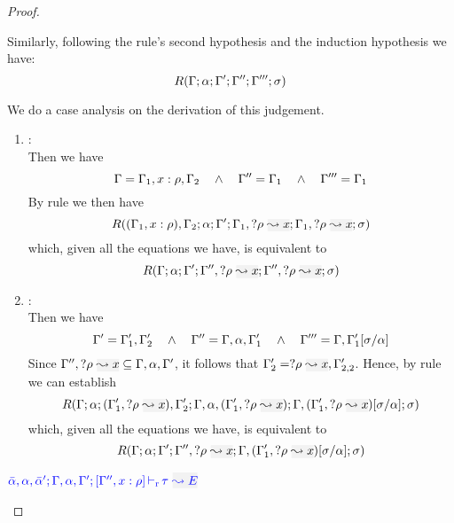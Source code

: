 \begin{proof}
\begin{description}
  Similarly, following the rule's second hypothesis and the induction hypothesis we have:
\begin{equation*}
  R(\Gamma;\alpha;\Gamma';\Gamma'';\Gamma''';\sigma)
\end{equation*}

  We do a case analysis on the derivation of this judgement.
  \begin{enumerate}
  \item {}: \\ Then we have
\begin{equation*}
  \Gamma = \Gamma_1,x:\rho,\Gamma_2  \quad\wedge\quad \Gamma'' = \Gamma_1 \quad\wedge\quad \Gamma''' = \Gamma_1
\end{equation*}
       By rule  we then have
\begin{equation*}
R((\tenv_1,x:\rulet),\tenv_2;\alpha;\tenv';\tenv_1,\envi{\rulet}{x};\tenv_1,\envi{\rulet}{x};\suty)
\end{equation*}
        which, given all the equations we have, is equivalent to
\begin{equation*}
R(\tenv;\alpha;\tenv';\tenv'',\envi{\rulet}{x};\tenv'',\envi{\rulet}{x};\suty)
\end{equation*}

  \item {}: \\
   Then we have
\begin{equation*}
  \Gamma' = \Gamma_1',\Gamma_2'  \quad\wedge\quad \Gamma'' = \Gamma,\alpha,\Gamma_1' \quad\wedge\quad 
      \Gamma''' = \Gamma,\Gamma_1'[\sigma/\alpha]
\end{equation*}
  Since $\tenv'',\envi{\rulet}{x} \subseteq \tenv,\alpha,\tenv'$, it follows that $\tenv_2' = \envi{\rulet}{x},\tenv_{2,2}'$.
  Hence, by rule  we can establish
\begin{equation*}
R(\tenv;\alpha;(\tenv_1',\envi{\rulet}{x}),\tenv_2';\tenv,\alpha,(\tenv_1',\envi{\rulet}{x});\tenv,(\tenv_1',\envi{\rulet}{x})[\suty/\alpha];\suty)
\end{equation*}
        which, given all the equations we have, is equivalent to
\begin{equation*}
R(\tenv;\alpha;\tenv';\tenv'',\envi{\rulet}{x};\tenv,(\tenv_1',\envi{\rulet}{x})[\suty/\alpha];\suty)
\end{equation*}
  \end{enumerate}
  
\item[\fbox{\rref{L-Var}}]\quad$\dlres{\bar{\alpha},\alpha,\bar{\alpha}'}{\tenv,\alpha,\tenv'}{\tenv'', \relation{x}{\rulet}}{\type}{E}$\ \\


\end{description}
\end{proof}

